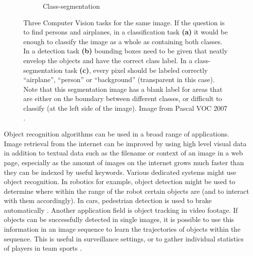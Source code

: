\begin{figure}[hbt]
\begin{subfigure}[b]{0.3\textwidth}
            \caption{Class-segmentation}
            \label{fig:segmentation}
            \end{subfigure}
    \caption{Three Computer Vision tasks for the same image. If the question is to find persons and airplanes, in a classification task \textbf{(a)} it would be enough to classify the image as a whole as containing both classes. In a detection task \textbf{(b)} bounding boxes need to be given that neatly envelop the objects and have the correct class label. In a class-segmentation task \textbf{(c)}, every pixel should be labeled correctly ``airplane'', ``person'' or ``background'' (transparent in this case). Note that this segmentation image has a blank label for areas that are either on the boundary between different classes, or difficult to classify (at the left side of the image). Image from Pascal VOC 2007 \cite{pascal-voc-2007}.}
    \label{fig:clsdetseg}
\end{figure}

Object recognition algorithms can be used in a broad range of applications. Image retrieval from the internet can be improved by using high level visual data in addition to textual data such as the filename or context of an image in a web page, especially as the amount of images on the internet grows much faster than they can be indexed by useful keywords. Various dedicated systems might use object recognition. In robotics for example, object detection might be used to determine where within the range of the robot certain objects are (and to interact with them accordingly). In cars, pedestrian detection is used to brake automatically \cite{geronimo2010survey}. Another application field is object tracking in video footage. If objects can be successfully detected in single images, it is possible to use this information in an image sequence to learn the trajectories of objects within the sequence. This is useful in surveillance settings, or to gather individual statistics of players in team sports \cite{benfold2011stable, ekin2003automatic, lipton1998moving}.\\


